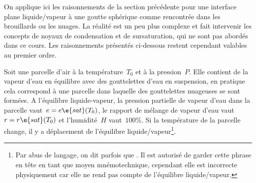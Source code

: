 \sk
On applique ici les raisonnements de la section précédente pour une interface plane liquide/vapeur à une goutte sphérique comme rencontrée dans les brouillards ou les nuages. La réalité est un peu plus complexe et fait intervenir les concepts de noyaux de condensation et de sursaturation, qui ne sont pas abordés dans ce cours. Les raisonnements présentés ci-dessous restent cependant valables au premier ordre.

\sk
Soit une parcelle d'air à la température~$T_0$ et à la pression~$P$. Elle contient de la vapeur d'eau en équilibre avec des gouttelettes d'eau en suspension, en pratique cela correspond à une parcelle dans laquelle des gouttelettes nuageuses se sont formées. A l'équilibre liquide-vapeur, la pression partielle de vapeur d'eau dans la parcelle vaut~$e=e\e{sat}(T_0)$, le rapport de mélange de vapeur d'eau vaut~$r=r\e{sat}(T_0)$ et l'humidité~$H$ vaut~$100\%$. Si la température de la parcelle change, il y a déplacement de l'équilibre liquide/vapeur\footnote{Par abus de langage, on dit parfois que . Il est autorisé de garder cette phrase en tête en tant que moyen mnémotechnique, cependant elle est incorrecte physiquement car elle ne rend pas compte de l'équilibre liquide/vapeur.}.
